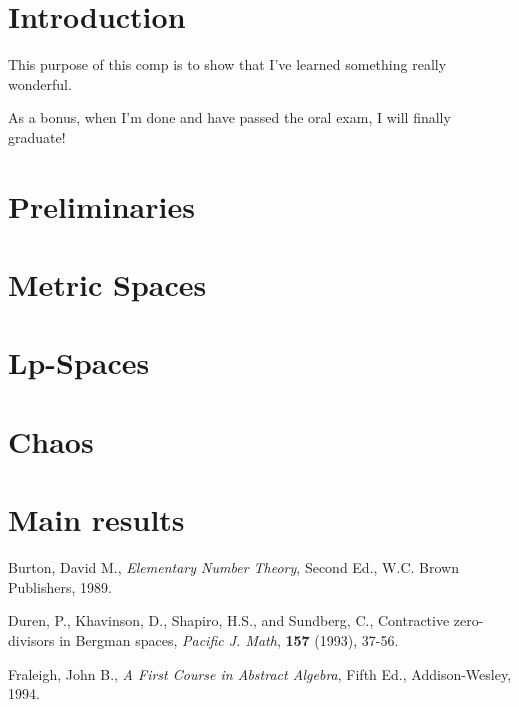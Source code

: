 \documentclass[11pt]{article}
\theoremstyle{plain}
\theoremstyle{definition}
\begin{document}
\newpage
\doublespacing
\setcounter{page}{1}
\section{Introduction}

This purpose of this comp is to show that I've learned something really wonderful.

As a bonus, when I'm done and have passed the oral exam, I will finally graduate!


\newpage
\section{Preliminaries}


\newpage
\section{Metric Spaces}


\newpage
\section{Lp-Spaces}


\newpage
\section{Chaos}


\newpage
\section{Main results}



\newpage  
\begin{thebibliography}{99}
\singlespacing
{} Burton, David M., \emph{Elementary Number Theory}, Second Ed., W.C. Brown Publishers, 1989.

 Duren, P., Khavinson, D., Shapiro, H.S., and Sundberg, C., Contractive zero-divisors in Bergman spaces, \textit{Pacific J. Math}, \textbf{157} (1993), 37-56.

  Fraleigh, John B., \emph{A First Course in Abstract Algebra}, Fifth Ed., Addison-Wesley, 1994. 

\end{thebibliography}

\end{document}
